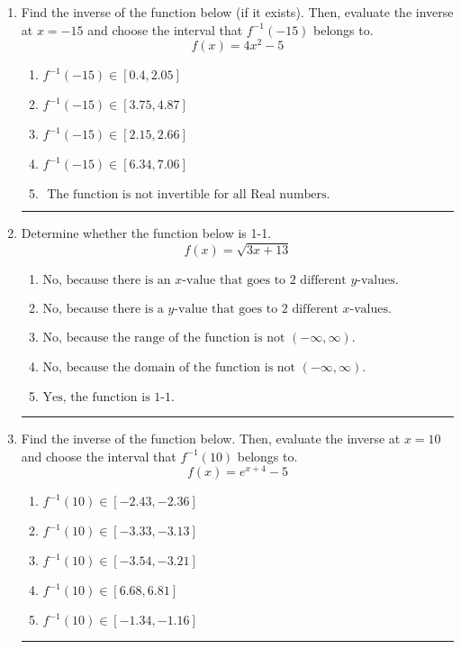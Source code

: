\documentclass[14pt]{extbook}
\newcommand{\litem}[1]{\item#1\hspace*{-1cm}\rule{\textwidth}{0.4pt}}
\begin{document}
\begin{enumerate}
{\begin{enumerate}[label=\Alph*.]
\end{enumerate} }
\litem{
Find the inverse of the function below (if it exists). Then, evaluate the inverse at $x = -15$ and choose the interval that $f^{-1}(-15)$ belongs to.\[ f(x) = 4 x^2 - 5 \]\begin{enumerate}[label=\Alph*.]
\item \( f^{-1}(-15) \in [0.4, 2.05] \)
\item \( f^{-1}(-15) \in [3.75, 4.87] \)
\item \( f^{-1}(-15) \in [2.15, 2.66] \)
\item \( f^{-1}(-15) \in [6.34, 7.06] \)
\item \( \text{ The function is not invertible for all Real numbers. } \)

\end{enumerate} }
\litem{
Determine whether the function below is 1-1.\[ f(x) = \sqrt{3 x + 13} \]\begin{enumerate}[label=\Alph*.]
\item \( \text{No, because there is an $x$-value that goes to 2 different $y$-values.} \)
\item \( \text{No, because there is a $y$-value that goes to 2 different $x$-values.} \)
\item \( \text{No, because the range of the function is not $(-\infty, \infty)$.} \)
\item \( \text{No, because the domain of the function is not $(-\infty, \infty)$.} \)
\item \( \text{Yes, the function is 1-1.} \)

\end{enumerate} }
\litem{
Find the inverse of the function below. Then, evaluate the inverse at $x = 10$ and choose the interval that $f^{-1}(10)$ belongs to.\[ f(x) = e^{x+4}-5 \]\begin{enumerate}[label=\Alph*.]
\item \( f^{-1}(10) \in [-2.43, -2.36] \)
\item \( f^{-1}(10) \in [-3.33, -3.13] \)
\item \( f^{-1}(10) \in [-3.54, -3.21] \)
\item \( f^{-1}(10) \in [6.68, 6.81] \)
\item \( f^{-1}(10) \in [-1.34, -1.16] \)

\end{enumerate} }
\end{enumerate}
\end{document}
